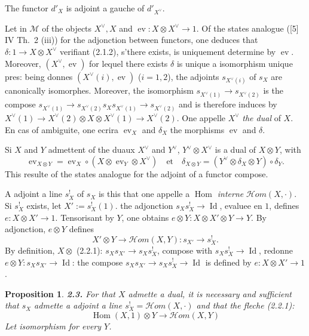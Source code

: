 \documentclass[12pt,a4paper]{article}
\theoremstyle{plain}
\newtheorem{proposition}[theorem]{Proposition}
\theoremstyle{definition}
\theoremstyle{remark}
\DeclareMathOperator{\Hom}{Hom}
\DeclareMathOperator{\Id}{Id}
\DeclareMathOperator{\ev}{ev}
\begin{document}
The functor $d'_X$ is adjoint a gauche of $d'_{X^\vee}$.

Let in $\mathcal{M}$ of the objects $X^\vee, X$ and $\ev : X \otimes X^\vee \to 1$. Of the states analogue ([5] IV Th.~2 (iii)) for the adjonction between functors, one deduces that $\delta : 1 \to X \otimes X^\vee$ verifiant (2.1.2), s'there exists, is uniquement determine by $\ev$. Moreover, $(X^\vee, \ev)$ for lequel there exists $\delta$ is unique a isomorphism unique pres: being donnes $(X^\vee(i), \ev)$ ($i = 1,2$), the adjoints $s_{X^\vee(i)}$ of $s_X$ are canonically isomorphes. Moreover, the isomorphism $s_{X^\vee(1)} \to s_{X^\vee(2)}$ is the compose $s_{X^\vee(1)} \to s_{X^\vee(2)} s_X s_{X^\vee(1)} \to s_{X^\vee(2)}$ and is therefore induces by $X^\vee(1) \to X^\vee(2) \otimes X \otimes X^\vee(1) \to X^\vee(2)$. One appelle $X^\vee$ \emph{the dual} of $X$. En cas of ambiguite, one ecrira $\ev_X$ and $\delta_X$ the morphisms $\ev$ and $\delta$.

Si $X$ and $Y$ admettent of the duaux $X^\vee$ and $Y^\vee$, $Y^\vee \otimes X^\vee$ is a dual of $X \otimes Y$, with
\[
\ev_{X \otimes Y} = \ev_X \circ (X \otimes \ev_Y \otimes X^\vee) \quad \text{et} \quad \delta_{X \otimes Y} = (Y^\vee \otimes \delta_X \otimes Y) \circ \delta_Y.
\]
This resulte of the states analogue for the adjoint of a functor compose.

A adjoint a line $s_X^!$ of $s_X$ is this that one appelle a \emph{$\Hom$ interne} $\mathcal{H}om(X,\cdot)$. Si $s_X^!$ exists, let $X' := s_X^!(1)$. the adjonction $s_X s_X^! \to \Id$, evaluee en $1$, defines $e : X \otimes X' \to 1$. Tensorisant by $Y$, one obtains $e \otimes Y : X \otimes X' \otimes Y \to Y$. By adjonction, $e \otimes Y$ defines
\begin{equation}\label{eq:2.2.1}
X' \otimes Y \to \mathcal{H}om(X,Y) : s_{X'} \to s_X^!.
\end{equation}
By definition, $X \otimes$ (2.2.1): $s_X s_{X'} \to s_X s_X^!$, compose with $s_X s_X^! \to \Id$, redonne $e \otimes Y : s_X s_{X'} \to \Id$: the compose $s_X s_{X'} \to s_X s_X^! \to \Id$ is defined by $e : X \otimes X' \to 1$.

\begin{proposition}\label{prop:2.3}
\textbf{2.3.} For that $X$ admette a dual, it is necessary and sufficient that $s_X$ admette a adjoint a line $s_X^! = \mathcal{H}om(X,\cdot)$ and that the fleche (2.2.1):
\[
\Hom(X,1) \otimes Y \to \mathcal{H}om(X,Y)
\]
Let isomorphism for every $Y$.
\end{proposition}
\end{document}

